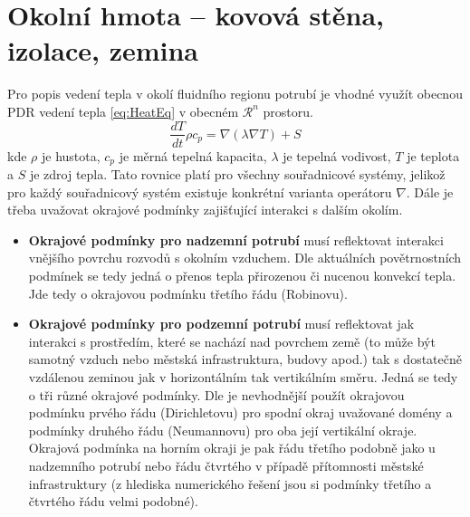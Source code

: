 \section{Okolní hmota – kovová stěna, izolace, zemina}
\label{sec:SurroundingMass}
Pro popis vedení tepla v okolí fluidního regionu potrubí je vhodné využít
obecnou PDR vedení tepla \ref{eq:HeatEq} v obecném \(\mathcal{R}^n\) prostoru.
\begin{equation}
  \label{eq:HeatEq}
  \frac{dT}{dt}\rho{c_p}=\nabla(\lambda\nabla{T})+S
\end{equation}
kde \(\rho\) je hustota, \(c_p\) je měrná tepelná kapacita, \(\lambda\) je
tepelná vodivost, \(T\) je teplota a \(S\) je zdroj tepla. Tato rovnice platí
pro všechny souřadnicové systémy, jelikož pro každý souřadnicový systém
existuje konkrétní varianta operátoru \(\nabla\). Dále je třeba uvažovat
okrajové podmínky zajišťující interakci s dalším okolím.
\begin{itemize}
  \item
    \textbf{Okrajové podmínky pro nadzemní potrubí} musí reflektovat interakci
    vnějšího povrchu rozvodů s okolním vzduchem. Dle aktuálních povětrnostních
    podmínek se tedy jedná o přenos tepla přirozenou či nucenou
    konvekcí tepla. Jde tedy o okrajovou podmínku třetího řádu (Robinovu).
  \item
    \textbf{Okrajové podmínky pro podzemní potrubí} musí reflektovat jak
    interakci s prostředím, které se nachází nad povrchem země (to může být
    samotný vzduch nebo městská infrastruktura, budovy apod.) tak s dostatečně
    vzdálenou zeminou jak v horizontálním tak vertikálním směru. Jedná se tedy
    o tři různé okrajové podmínky. Dle  je nevhodnější použít
    okrajovou podmínku prvého řádu (Dirichletovu) pro spodní okraj uvažované
    domény a podmínky druhého řádu (Neumannovu) pro oba její vertikální okraje.
    Okrajová podmínka na horním okraji je pak řádu třetího podobně jako u
    nadzemního potrubí nebo řádu čtvrtého v případě přítomnosti městské
    infrastruktury (z hlediska numerického řešení jsou si podmínky třetího a
    čtvrtého řádu velmi podobné).
\end{itemize}

